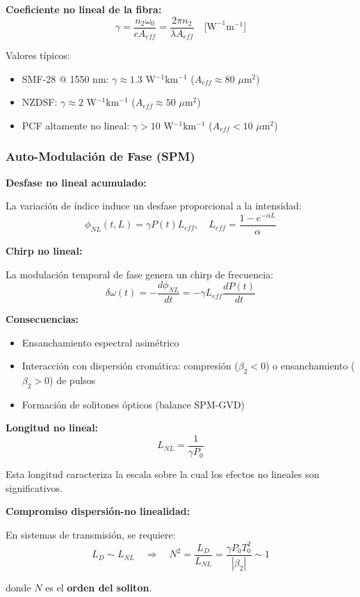 \documentclass[11pt,a4paper]{article}
\begin{document}
\textbf{Coeficiente no lineal de la fibra:}
\begin{equation}
    \gamma = \frac{n_2\omega_0}{cA_{eff}} = \frac{2\pi n_2}{\lambda A_{eff}} \quad \text{[W}^{-1}\text{m}^{-1}\text{]}
\end{equation}

Valores típicos:
\begin{itemize}
    \item SMF-28 @ 1550 nm: $\gamma \approx 1.3$ W$^{-1}$km$^{-1}$ ($A_{eff} \approx 80$ $\mu$m$^2$)
    \item NZDSF: $\gamma \approx 2$ W$^{-1}$km$^{-1}$ ($A_{eff} \approx 50$ $\mu$m$^2$)
    \item PCF altamente no lineal: $\gamma > 10$ W$^{-1}$km$^{-1}$ ($A_{eff} < 10$ $\mu$m$^2$)
\end{itemize}

\subsubsection{Auto-Modulación de Fase (SPM)}

\textbf{Desfase no lineal acumulado:}

La variación de índice induce un desfase proporcional a la intensidad:
\begin{equation}
    \phi_{NL}(t,L) = \gamma P(t)L_{eff}, \quad L_{eff} = \frac{1 - e^{-\alpha L}}{\alpha}
\end{equation}

\textbf{Chirp no lineal:}

La modulación temporal de fase genera un chirp de frecuencia:
\begin{equation}
    \delta\omega(t) = -\frac{d\phi_{NL}}{dt} = -\gamma L_{eff}\frac{dP(t)}{dt}
\end{equation}

\textbf{Consecuencias:}
\begin{itemize}
    \item Ensanchamiento espectral asimétrico
    \item Interacción con dispersión cromática: compresión ($\beta_2 < 0$) o ensanchamiento ($\beta_2 > 0$) de pulsos
    \item Formación de solitones ópticos (balance SPM-GVD)
\end{itemize}

\begin{importante}
\textbf{Longitud no lineal:}
\begin{equation}
    L_{NL} = \frac{1}{\gamma P_0}
\end{equation}

Esta longitud caracteriza la escala sobre la cual los efectos no lineales son significativos.

\textbf{Compromiso dispersión-no linealidad:}

En sistemas de transmisión, se requiere:
\begin{equation}
    L_D \sim L_{NL} \quad \Rightarrow \quad N^2 = \frac{L_D}{L_{NL}} = \frac{\gamma P_0 T_0^2}{|\beta_2|} \sim 1
\end{equation}

donde $N$ es el \textbf{orden del soliton}.
\end{importante}
\end{document}
